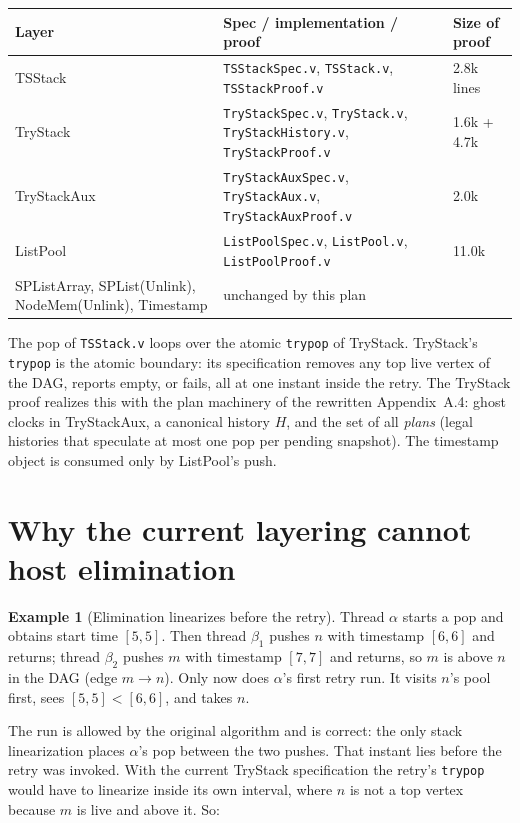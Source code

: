 \documentclass[11pt]{article}
\theoremstyle{definition}
\newtheorem{example}[lemma]{Example}
\theoremstyle{remark}
\newcommand{\code}[1]{\texttt{#1}}
\newcommand{\file}[1]{\texttt{#1}}
\begin{document}
\begin{center}
\small
\begin{tabularx}{\textwidth}{@{}lXl@{}}
\toprule
Layer & Spec / implementation / proof & Size of proof \\
\midrule
TSStack & \file{TSStackSpec.v}, \file{TSStack.v}, \file{TSStackProof.v} & 2.8k lines \\
TryStack & \file{TryStackSpec.v}, \file{TryStack.v}, \file{TryStackHistory.v}, \file{TryStackProof.v} & 1.6k + 4.7k \\
TryStackAux & \file{TryStackAuxSpec.v}, \file{TryStackAux.v}, \file{TryStackAuxProof.v} & 2.0k \\
ListPool & \file{ListPoolSpec.v}, \file{ListPool.v}, \file{ListPoolProof.v} & 11.0k \\
SPListArray, SPList(Unlink), NodeMem(Unlink), Timestamp & unchanged by this plan & \\
\bottomrule
\end{tabularx}
\end{center}

The pop of \file{TSStack.v} loops over the atomic \code{trypop} of
TryStack. TryStack's \code{trypop} is the atomic boundary: its
specification removes any top live vertex of the DAG, reports empty, or
fails, all at one instant inside the retry. The TryStack proof realizes
this with the plan machinery of the rewritten Appendix~A.4: ghost clocks
in TryStackAux, a canonical history $H$, and the set of all
\emph{plans} (legal histories that speculate at most one pop per pending
snapshot). The timestamp object is consumed only by ListPool's push.

\section{Why the current layering cannot host elimination}
\label{sec:problem}

\begin{example}[Elimination linearizes before the retry]
\label{ex:early}
Thread $\alpha$ starts a pop and obtains start time $[5,5]$. Then
thread $\beta_1$ pushes $n$ with timestamp $[6,6]$ and returns; thread
$\beta_2$ pushes $m$ with timestamp $[7,7]$ and returns, so $m$ is above
$n$ in the DAG (edge $m \to n$). Only now does $\alpha$'s first retry
run. It visits $n$'s pool first, sees $[5,5] < [6,6]$, and takes $n$.
\end{example}

The run is allowed by the original algorithm and is correct: the only
stack linearization places $\alpha$'s pop between the two pushes. That
instant lies before the retry was invoked. With the current TryStack
specification the retry's \code{trypop} would have to linearize inside
its own interval, where $n$ is not a top vertex because $m$ is live and
above it. So:
\end{document}
